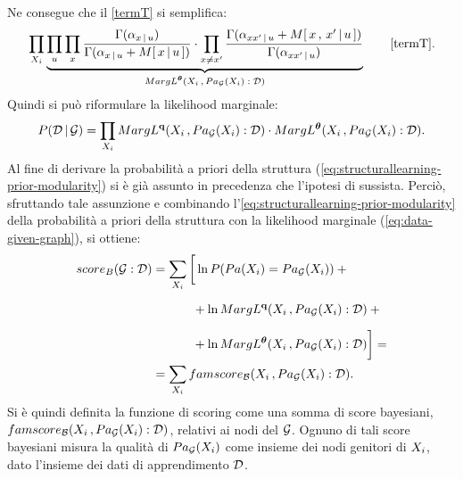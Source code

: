 Ne consegue che il \autoref{termT} si semplifica:
\[
\prod_{\setel{X}_i} \underbrace{\prod_{\setel{u}} \prod_{\setel{x}} \frac{\Gamma(\alpha_{\setel{x}\,\arrowvert\,\setel{u}})}{\Gamma(\alpha_{\setel{x}\,\arrowvert\,\setel{u}}+\mstat{x\,\arrowvert\,\setel{u}})} \cdot \prod_{\setel{x}\neq\setel{x}^\prime} \frac{\Gamma(\alpha_{\setel{x}\setel{x}^\prime\,\arrowvert\,\setel{u}}+\mstat[x]{\setel{x}^\prime\,\arrowvert\,\setel{u}})}{\Gamma(\alpha_{\setel{x}\setel{x}^\prime\,\arrowvert\,\setel{u}})}}_\text{$MargL^{\param{$\theta$}}(\setel{X}_i\,,Pa_{\conceptsym{G}}(\setel{X}_i):\conceptsym{D})$} \tag*{\ref{termT}} \text{.}
\]
Quindi si può riformulare la likelihood marginale:\small
\begin{equation}\label{eq:data-given-graph}
P(\mathcal{D}\,\arrowvert\,\mathcal{G}) = \prod_{\mathnormal{X}_i} MargL^{\boldsymbol{\textbf{\text{q}}}}(\mathnormal{X}_i\,,Pa_{\mathcal{G}}(\mathnormal{X}_i):\mathcal{D}) \cdot MargL^{\boldsymbol{\textbf{\text{$\theta$}}}}(\mathnormal{X}_i\,,Pa_{\mathcal{G}}(\mathnormal{X}_i):\mathcal{D}) \text{.}
\end{equation}\normalsize
Al fine di derivare la probabilità a priori della struttura (\autoref{eq:structurallearning-prior-modularity}) si è già assunto in precedenza che l'ipotesi di \emph{} sussista. Perciò, sfruttando tale assunzione e combinando l'\autoref{eq:structurallearning-prior-modularity} della probabilità a priori della struttura con la likelihood marginale (\autoref{eq:data-given-graph}), si ottiene:
\begin{align}\label{eq:bayesian-score}
score_B(\mathcal{G}:\mathcal{D}) &= \sum_{\mathnormal{X}_i} \bigg[ \ln{P(Pa(\mathnormal{X}_i)=Pa_{\mathcal{G}}(\mathnormal{X}_i))} + \bigg.\nonumber\\
& \qquad \quad \> \bigg.{} + \ln{MargL^{\boldsymbol{\textbf{\text{q}}}}(\mathnormal{X}_i\,,Pa_{\mathcal{G}}(\mathnormal{X}_i):\mathcal{D})} + \bigg.\nonumber\\
& \qquad \quad \> \bigg.{} + \ln{MargL^{\boldsymbol{\textbf{\text{$\theta$}}}}(\mathnormal{X}_i\,,Pa_{\mathcal{G}}(\mathnormal{X}_i):\mathcal{D})} \bigg] = \nonumber\\
&= \sum_{\mathnormal{X}_i} famscore_{\mathcal{B}}(\mathnormal{X}_i\,,Pa_{\mathcal{G}}(\mathnormal{X}_i):\mathcal{D}) \text{.}
\end{align}
Si è quindi definita la funzione di scoring come una somma di score bayesiani, $famscore_{\mathcal{B}}(\mathnormal{X}_i\,,Pa_{\mathcal{G}}(\mathnormal{X}_i):\mathcal{D})$, relativi ai nodi del  $\mathcal{G}$. Ognuno di tali score bayesiani misura la qualità di $Pa_{\mathcal{G}}(\mathnormal{X}_i)$ come insieme dei nodi genitori di $\mathnormal{X}_i$, dato l'insieme dei dati di apprendimento $\mathcal{D}$.

